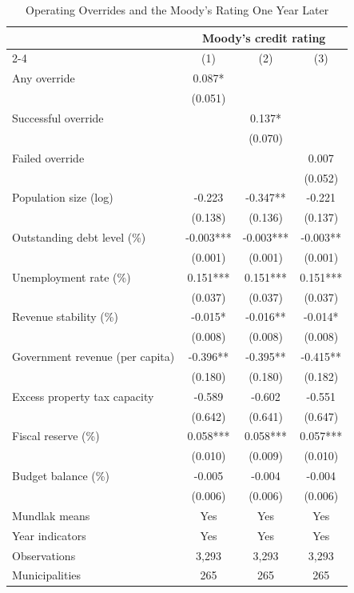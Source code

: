 \begin{table}[!htbp]
\centering
\caption{Operating Overrides and the Moody's Rating One Year Later}
\label{tab:post_northeast_mundlak_rating_t1}
\small
\begin{tabular}{lccc}
\toprule
 & \multicolumn{3}{c}{Moody's credit rating} \\
\cmidrule(lr){2-4}
 & (1) & (2) & (3) \\
\midrule
Any override & 0.087* &  &  \\
 & (0.051) &  &  \\
Successful override &  & 0.137* &  \\
 &  & (0.070) &  \\
Failed override &  &  & 0.007 \\
 &  &  & (0.052) \\
\midrule
Population size (log) & -0.223 & -0.347** & -0.221 \\
 & (0.138) & (0.136) & (0.137) \\
Outstanding debt level (\%) & -0.003*** & -0.003*** & -0.003** \\
 & (0.001) & (0.001) & (0.001) \\
Unemployment rate (\%) & 0.151*** & 0.151*** & 0.151*** \\
 & (0.037) & (0.037) & (0.037) \\
Revenue stability (\%) & -0.015* & -0.016** & -0.014* \\
 & (0.008) & (0.008) & (0.008) \\
Government revenue (per capita) & -0.396** & -0.395** & -0.415** \\
 & (0.180) & (0.180) & (0.182) \\
Excess property tax capacity & -0.589 & -0.602 & -0.551 \\
 & (0.642) & (0.641) & (0.647) \\
Fiscal reserve (\%) & 0.058*** & 0.058*** & 0.057*** \\
 & (0.010) & (0.009) & (0.010) \\
Budget balance (\%) & -0.005 & -0.004 & -0.004 \\
 & (0.006) & (0.006) & (0.006) \\
\midrule
Mundlak means & Yes & Yes & Yes \\
Year indicators & Yes & Yes & Yes \\
Observations & 3,293 & 3,293 & 3,293 \\
Municipalities & 265 & 265 & 265 \\
\bottomrule
\end{tabular}

\end{table}
